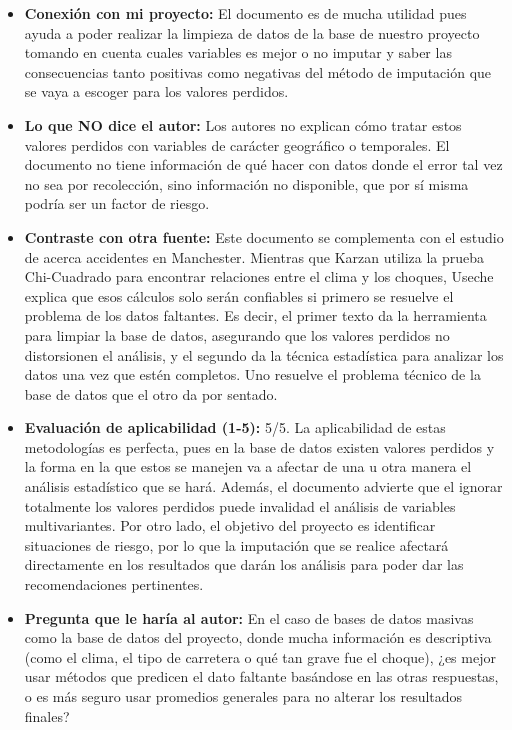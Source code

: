 \documentclass[12pt]{article}
\begin{document}
\begin{itemize}
    \item \textbf{Conexión con mi proyecto:} El documento es de 
    mucha utilidad pues ayuda a poder realizar la limpieza de datos 
    de la base de nuestro proyecto tomando en cuenta cuales variables es mejor o no 
    imputar y saber las consecuencias tanto positivas como negativas del método de imputación que se vaya a escoger para los valores perdidos.
    
	\item \textbf{Lo que NO dice el autor:} Los autores no explican cómo tratar estos 
	valores perdidos con variables de carácter geográfico o temporales. El documento no tiene 
	información de qué hacer con datos donde el error tal vez no sea por recolección, sino 
	información no disponible, que por sí misma podría ser un factor de riesgo.    
	\item \textbf{Contraste con otra fuente:} Este documento se complementa con el 
	estudio de \textcite{KARZAN2017} acerca accidentes en Manchester. Mientras que Karzan 
	utiliza la prueba Chi-Cuadrado para encontrar relaciones entre el clima y los choques, 
	Useche explica que esos cálculos solo serán confiables si primero se resuelve el 
	problema de los datos faltantes. Es decir, el primer texto da la herramienta para 
	limpiar la base de datos, asegurando que los valores perdidos no distorsionen el 
	análisis, y el segundo da la técnica estadística para analizar los datos una vez 
	que estén completos. Uno resuelve el problema técnico de la base de datos que el otro da por sentado.
    
	\item \textbf{Evaluación de aplicabilidad (1-5):} 5/5. La aplicabilidad de estas 
	metodologías es perfecta, pues en la base de datos existen valores perdidos y la 
	forma en la que estos se manejen va a afectar de una u otra manera el análisis 
	estadístico que se hará. Además, el documento advierte que el ignorar totalmente 
	los valores perdidos puede invalidad el análisis de variables multivariantes. 
	Por otro lado, el objetivo del proyecto es identificar situaciones de riesgo, 
	por lo que la imputación que se realice afectará directamente en los resultados 
	que darán los análisis para poder dar las recomendaciones pertinentes.
    
	\item \textbf{Pregunta que le haría al autor:} En el caso de bases de datos 
	masivas como la base de datos del proyecto, donde mucha información es descriptiva 
	(como el clima, el tipo de carretera o qué tan grave fue el choque), ¿es mejor 
	usar métodos que predicen el dato faltante basándose en las otras respuestas, o
	es más seguro usar promedios generales para no alterar los resultados finales?
    

\end{itemize}
\end{document}
